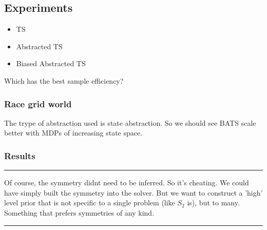 

\subsection{Experiments}

\begin{itemize}
	\tightlist
	\item TS
	\item Abstracted TS
	\item Biased Abstracted TS
\end{itemize}

Which has the best sample efficiency?

\subsubsection{Race grid world}

The trype of abstraction used is state abstraction. So we should see BATS scale better with MDPs of increasing state space.

\subsubsection{Results}




\begin{center}\rule{0.5\linewidth}{\linethickness}\end{center}

Of course, the symmetry didnt need to be inferred. So it's cheating.
We could have simply built the symmetry into the solver. But we want to
construct a 'high' level prior that is not specific to a single problem (like $S_2$ is), but
to many. Something that prefers symmetries of any kind.


\begin{center}\rule{0.5\linewidth}{\linethickness}\end{center}



